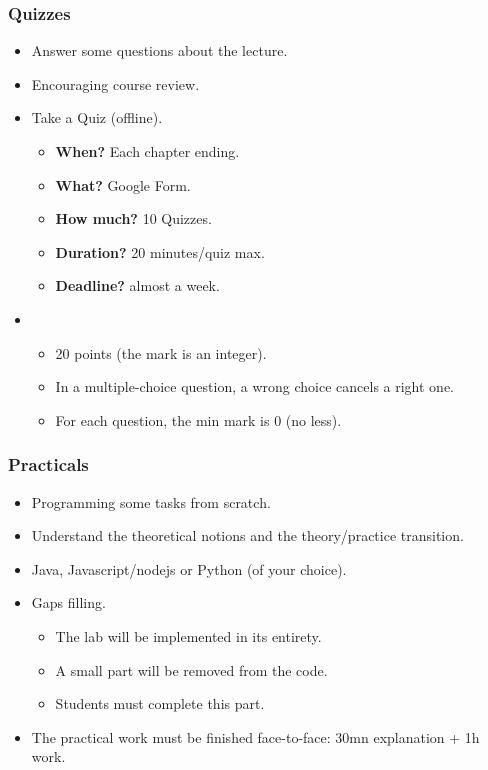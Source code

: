 \documentclass{beamer}
\begin{document}
\begin{frame}
	\frametitle{Quizzes}
	
	\begin{itemize}
		\item Answer some questions about the lecture.
		\item {} Encouraging course review.
		\item {} Take a Quiz (offline).
		\begin{itemize}
			\item \textbf{When?} Each chapter ending.
			\item \textbf{What?} Google Form.
			\item \textbf{How much?} 10 Quizzes.
			\item \textbf{Duration?} 20 minutes/quiz max.
			\item \textbf{Deadline?} almost a week.
		\end{itemize}
		\item {}
		\begin{itemize}
			\item 20 points (the mark is an integer).
			\item In a multiple-choice question, a wrong choice cancels a right one.
			\item For each question, the min mark is 0 (no less).
		\end{itemize}
	\end{itemize}
	
\end{frame}

\begin{frame}
	\frametitle{Practicals}
	
	\begin{itemize}
		\item Programming some tasks from scratch.
		\item {} Understand the theoretical notions and the theory/practice transition.
		\item {} Java, Javascript/nodejs or Python (of your choice).
		\item {} Gaps filling.
		\begin{itemize}
			\item The lab will be implemented in its entirety.
			\item A small part will be removed from the code.
			\item Students must complete this part.
		\end{itemize}
		\item The practical work must be finished face-to-face: 30mn explanation + 1h work.
	\end{itemize}
	
\end{frame}
\end{document}
